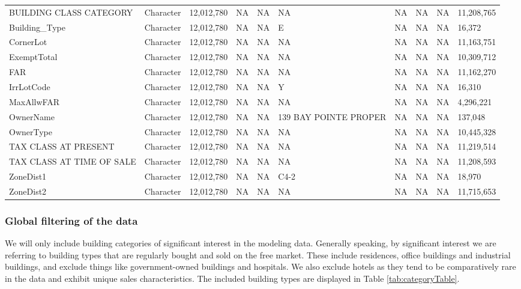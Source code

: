 \documentclass[12pt,]{article}
\begin{document}
\begin{table}
{\begin{tabular}[t]{llllllllll}
\addlinespace
BUILDING CLASS CATEGORY & Character & 12,012,780 & NA & NA & NA & NA & NA & NA & 11,208,765\\
Building\_Type & Character & 12,012,780 & NA & NA & E & NA & NA & NA & 16,372\\
CornerLot & Character & 12,012,780 & NA & NA & NA & NA & NA & NA & 11,163,751\\
ExemptTotal & Character & 12,012,780 & NA & NA & NA & NA & NA & NA & 10,309,712\\
FAR & Character & 12,012,780 & NA & NA & NA & NA & NA & NA & 11,162,270\\
\addlinespace
IrrLotCode & Character & 12,012,780 & NA & NA & Y & NA & NA & NA & 16,310\\
MaxAllwFAR & Character & 12,012,780 & NA & NA & NA & NA & NA & NA & 4,296,221\\
OwnerName & Character & 12,012,780 & NA & NA & 139 BAY POINTE PROPER & NA & NA & NA & 137,048\\
OwnerType & Character & 12,012,780 & NA & NA & NA & NA & NA & NA & 10,445,328\\
TAX CLASS AT PRESENT & Character & 12,012,780 & NA & NA & NA & NA & NA & NA & 11,219,514\\
\addlinespace
TAX CLASS AT TIME OF SALE & Character & 12,012,780 & NA & NA & NA & NA & NA & NA & 11,208,593\\
ZoneDist1 & Character & 12,012,780 & NA & NA & C4-2 & NA & NA & NA & 18,970\\
ZoneDist2 & Character & 12,012,780 & NA & NA & NA & NA & NA & NA & 11,715,653\\
\bottomrule
\end{tabular}}
\end{table}

\hypertarget{global-filtering-of-the-data}{%
\subsubsection{Global filtering of the
data}\label{global-filtering-of-the-data}}

We will only include building categories of significant interest in the
modeling data. Generally speaking, by significant interest we are
referring to building types that are regularly bought and sold on the
free market. These include residences, office buildings and industrial
buildings, and exclude things like government-owned buildings and
hospitals. We also exclude hotels as they tend to be comparatively rare
in the data and exhibit unique sales characteristics. The included
building types are displayed in Table \ref{tab:categoryTable}.
\end{document}
